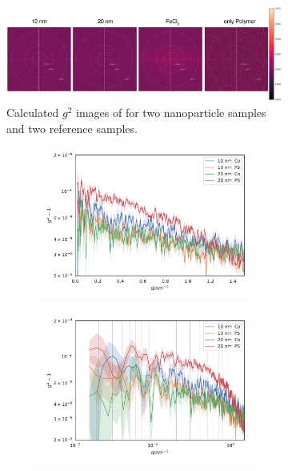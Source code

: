 \begin{figure}
	\centering
	\begin{subfigure}[b]{0.8\textwidth}
		\includegraphics[width=\linewidth]{images/resultnano2dr.pdf}
		\caption{Calculated $g^2$ images of for two nanoparticle samples and two reference samples.}
		\label{fig:resnano2d}
	\end{subfigure}
	\begin{subfigure}[b]{\textwidth}
		\begin{subfigure}[b]{0.49\textwidth}
		\includegraphics[width=\linewidth]{images/nano.pdf}
		\end{subfigure}
		\begin{subfigure}[b]{0.49\textwidth}
		\includegraphics[width=\linewidth]{images/nano_loglog.pdf}

\end{subfigure}
\end{subfigure}
\end{figure}
